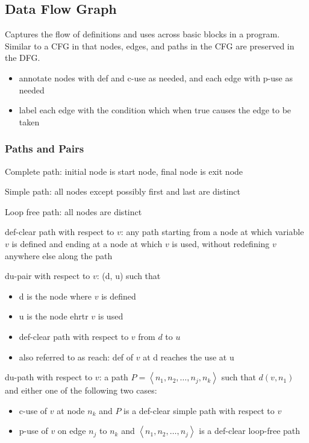 \documentclass[11pt]{article}
\begin{document}
\subsection{Data Flow Graph}
\label{sec:orgbcc2151}
Captures the flow of definitions and uses across basic blocks
in a program.
Similar to a CFG in that nodes, edges, and paths in the CFG
are preserved in the DFG.
\begin{itemize}
\item annotate nodes with def and c-use as needed, and each edge
with p-use as needed
\item label each edge with the condition which when true causes
the edge to be taken
\end{itemize}
\subsubsection{Paths and Pairs}
\label{sec:org8977cf0}
Complete path: initial node is start node, final node
is exit node

Simple path: all nodes except possibly first and last
are distinct

Loop free path: all nodes are distinct

def-clear path with respect to \(v\): any path starting from
a node at which variable \(v\) is defined and ending at a node
at which \(v\) is used, without redefining \(v\) anywhere else
along the path

du-pair with respect to \(v\): (d, u) such that
\begin{itemize}
\item d is the node where \(v\) is defined
\item u is the node ehrtr \(v\) is used
\item def-clear path with respect to \(v\) from \(d\) to \(u\)
\item also referred to as reach: def of \(v\) at d reaches the
use at u
\end{itemize}

du-path with respect to \(v\):
a path \(P = \left< n_{1}, n_{2}, \dots, n_{j}, n_{k} \right>\)
such that \(d(v, n_{1})\) and either one of the following two cases:
\begin{itemize}
\item c-use of \(v\) at node \(n_{k}\) and \(P\) is a def-clear simple path
with respect to \(v\)
\item p-use of \(v\) on edge \(n_{j}\) to \(n_{k}\) and
\(\left< n_{1}, n_{2}, \dots, n_{j} \right>\) is a def-clear
loop-free path
\end{itemize}
\end{document}
